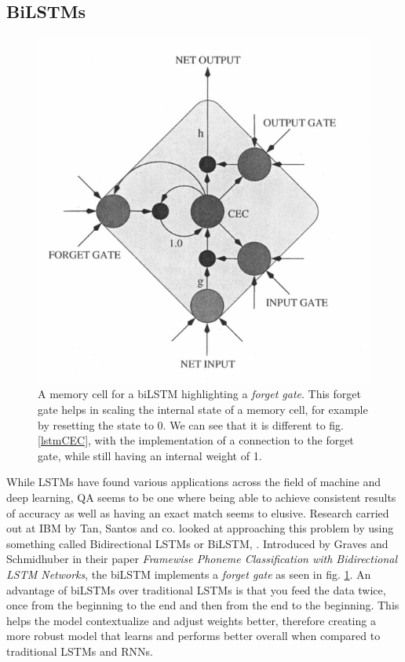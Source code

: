 \documentclass[a4paper,12pt]{report}
\begin{document}
             \subsection{BiLSTMs}\label{c2bilstm}
                  \begin{figure}[!h]
     	           \centering
                    \includegraphics[scale=0.35]{../images/lstm-biLstm.png}
           		   \caption{A memory cell for a biLSTM highlighting a \textit{forget gate}. This forget gate helps in scaling the internal state of a memory cell, for example by resetting the state to 0. We can see that it is different to fig. \ref{lstmCEC}, with the implementation of a connection to the forget gate, while still having an internal weight of 1. \citep{lstmBiLSTM}}\label{lstmBilstm}
                 \end{figure}
            While LSTMs have found various applications across the field of machine and deep learning, QA seems to be one where being able to achieve consistent results of accuracy as well as having an exact match seems to elusive.
            Research carried out at IBM by Tan, Santos and co. looked at approaching this problem by using something called Bidirectional LSTMs or BiLSTM, \citep{lstmBiLSTM}. Introduced by Graves and Schmidhuber in their paper \textit{Framewise Phoneme Classification with Bidirectional LSTM Networks}, the biLSTM implements a \textit{forget gate} as seen in fig. \ref{lstmBilstm}. An advantage of biLSTMs over traditional LSTMs is that you feed the data twice, once from the beginning to the end and then from the end to the beginning. This helps the model contextualize and adjust weights better, therefore creating a more robust model that learns and performs better overall when compared to traditional LSTMs and RNNs.
\end{document}
